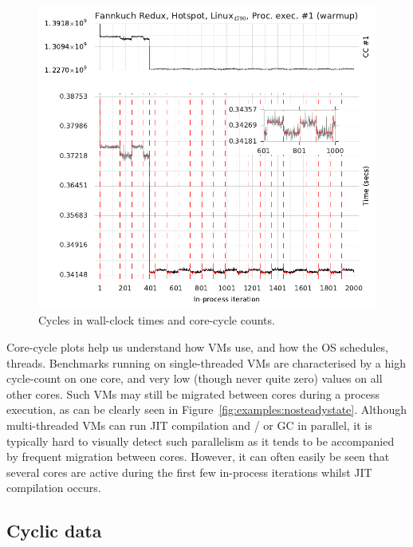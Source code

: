 \documentclass[acmlarge]{acmart}\settopmatter{printfolios=true}
\begin{document}
\begin{figure}[!tbp]
\begin{minipage}[b]{0.49\textwidth}
\includegraphics[width=\textwidth]{examples/new_cyclic.pdf}
\caption{Cycles in wall-clock times and core-cycle counts.}
\label{fig:examples:cycles}
\end{minipage}
\end{figure}

Core-cycle plots help us understand how VMs use, and how the OS schedules,
threads. Benchmarks running on single-threaded VMs are characterised by a high
cycle-count on one core, and very low (though never quite zero) values on all
other cores. Such VMs may still be migrated between cores during a process
execution, as can be clearly seen in Figure~\ref{fig:examples:nosteadystate}.
Although multi-threaded VMs can run JIT compilation and / or GC in parallel,
it is typically hard to visually detect such parallelism as it tends to be
accompanied by frequent migration between cores.
However, it can often easily be seen that several cores are active during the first few
in-process iterations whilst JIT compilation occurs.


\subsection{Cyclic data}
\label{sec:cyclic}
\end{document}
